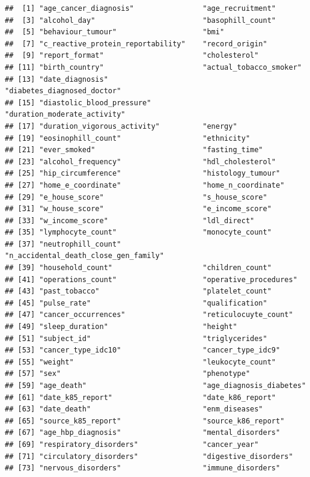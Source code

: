 \documentclass[
]{book}
\begin{document}
\begin{verbatim}
##  [1] "age_cancer_diagnosis"                "age_recruitment"                    
##  [3] "alcohol_day"                         "basophill_count"                    
##  [5] "behaviour_tumour"                    "bmi"                                
##  [7] "c_reactive_protein_reportability"    "record_origin"                      
##  [9] "report_format"                       "cholesterol"                        
## [11] "birth_country"                       "actual_tobacco_smoker"              
## [13] "date_diagnosis"                      "diabetes_diagnosed_doctor"          
## [15] "diastolic_blood_pressure"            "duration_moderate_activity"         
## [17] "duration_vigorous_activity"          "energy"                             
## [19] "eosinophill_count"                   "ethnicity"                          
## [21] "ever_smoked"                         "fasting_time"                       
## [23] "alcohol_frequency"                   "hdl_cholesterol"                    
## [25] "hip_circumference"                   "histology_tumour"                   
## [27] "home_e_coordinate"                   "home_n_coordinate"                  
## [29] "e_house_score"                       "s_house_score"                      
## [31] "w_house_score"                       "e_income_score"                     
## [33] "w_income_score"                      "ldl_direct"                         
## [35] "lymphocyte_count"                    "monocyte_count"                     
## [37] "neutrophill_count"                   "n_accidental_death_close_gen_family"
## [39] "household_count"                     "children_count"                     
## [41] "operations_count"                    "operative_procedures"               
## [43] "past_tobacco"                        "platelet_count"                     
## [45] "pulse_rate"                          "qualification"                      
## [47] "cancer_occurrences"                  "reticulocuyte_count"                
## [49] "sleep_duration"                      "height"                             
## [51] "subject_id"                          "triglycerides"                      
## [53] "cancer_type_idc10"                   "cancer_type_idc9"                   
## [55] "weight"                              "leukocyte_count"                    
## [57] "sex"                                 "phenotype"                          
## [59] "age_death"                           "age_diagnosis_diabetes"             
## [61] "date_k85_report"                     "date_k86_report"                    
## [63] "date_death"                          "enm_diseases"                       
## [65] "source_k85_report"                   "source_k86_report"                  
## [67] "age_hbp_diagnosis"                   "mental_disorders"                   
## [69] "respiratory_disorders"               "cancer_year"                        
## [71] "circulatory_disorders"               "digestive_disorders"                
## [73] "nervous_disorders"                   "immune_disorders"
\end{verbatim}
\end{document}
